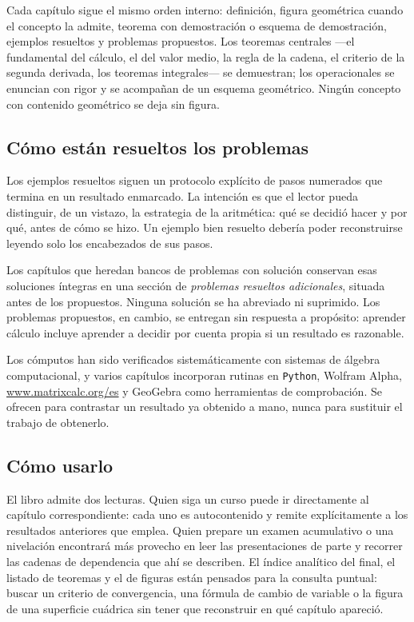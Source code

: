 \documentclass[12pt, fleqn, leqno]{book}
\theoremstyle{plain}
\theoremstyle{definition}
\begin{document}
Cada capítulo sigue el mismo orden interno: definición, figura geométrica cuando el concepto la admite, teorema con demostración o esquema de demostración, ejemplos resueltos y problemas propuestos. Los teoremas centrales ---el fundamental del cálculo, el del valor medio, la regla de la cadena, el criterio de la segunda derivada, los teoremas integrales--- se demuestran; los operacionales se enuncian con rigor y se acompañan de un esquema geométrico. Ningún concepto con contenido geométrico se deja sin figura.

\subsection*{Cómo están resueltos los problemas}

Los ejemplos resueltos siguen un protocolo explícito de pasos numerados que termina en un resultado enmarcado. La intención es que el lector pueda distinguir, de un vistazo, la estrategia de la aritmética: qué se decidió hacer y por qué, antes de cómo se hizo. Un ejemplo bien resuelto debería poder reconstruirse leyendo solo los encabezados de sus pasos.

Los capítulos que heredan bancos de problemas con solución conservan esas soluciones íntegras en una sección de \emph{problemas resueltos adicionales}, situada antes de los propuestos. Ninguna solución se ha abreviado ni suprimido. Los problemas propuestos, en cambio, se entregan sin respuesta a propósito: aprender cálculo incluye aprender a decidir por cuenta propia si un resultado es razonable.

Los cómputos han sido verificados sistemáticamente con sistemas de álgebra computacional, y varios capítulos incorporan rutinas en \texttt{Python}, Wolfram Alpha, \url{www.matrixcalc.org/es} y GeoGebra como herramientas de comprobación. Se ofrecen para contrastar un resultado ya obtenido a mano, nunca para sustituir el trabajo de obtenerlo.

\subsection*{Cómo usarlo}

El libro admite dos lecturas. Quien siga un curso puede ir directamente al capítulo correspondiente: cada uno es autocontenido y remite explícitamente a los resultados anteriores que emplea. Quien prepare un examen acumulativo o una nivelación encontrará más provecho en leer las presentaciones de parte y recorrer las cadenas de dependencia que ahí se describen. El índice analítico del final, el listado de teoremas y el de figuras están pensados para la consulta puntual: buscar un criterio de convergencia, una fórmula de cambio de variable o la figura de una superficie cuádrica sin tener que reconstruir en qué capítulo apareció.
\end{document}
